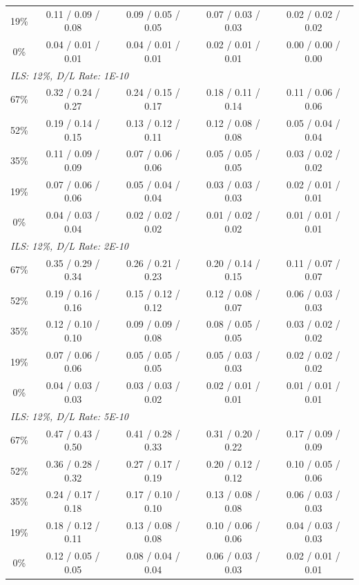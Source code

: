 \begin{table}[!h]
\begin{tabular}{ccccc}
19\% & 0.11 / 0.09 / 0.08 & 0.09 / 0.05 / 0.05 & 0.07 / 0.03 / 0.03 & 0.02 / 0.02 / 0.02\\
0\% & 0.04 / 0.01 / 0.01 & 0.04 / 0.01 / 0.01 & 0.02 / 0.01 / 0.01 & 0.00 / 0.00 / 0.00\\[2ex]
\multicolumn{5}{l}{\em ILS: 12\%, D/L Rate: 1E-10}\\[0.5ex]
67\% & 0.32 / 0.24 / 0.27 & 0.24 / 0.15 / 0.17 & 0.18 / 0.11 / 0.14 & 0.11 / 0.06 / 0.06\\
52\% & 0.19 / 0.14 / 0.15 & 0.13 / 0.12 / 0.11 & 0.12 / 0.08 / 0.08 & 0.05 / 0.04 / 0.04\\
35\% & 0.11 / 0.09 / 0.09 & 0.07 / 0.06 / 0.06 & 0.05 / 0.05 / 0.05 & 0.03 / 0.02 / 0.02\\
19\% & 0.07 / 0.06 / 0.06 & 0.05 / 0.04 / 0.04 & 0.03 / 0.03 / 0.03 & 0.02 / 0.01 / 0.01\\
0\% & 0.04 / 0.03 / 0.04 & 0.02 / 0.02 / 0.02 & 0.01 / 0.02 / 0.02 & 0.01 / 0.01 / 0.01\\[2ex]
\multicolumn{5}{l}{\em ILS: 12\%, D/L Rate: 2E-10}\\[0.5ex]
67\% & 0.35 / 0.29 / 0.34 & 0.26 / 0.21 / 0.23 & 0.20 / 0.14 / 0.15 & 0.11 / 0.07 / 0.07\\
52\% & 0.19 / 0.16 / 0.16 & 0.15 / 0.12 / 0.12 & 0.12 / 0.08 / 0.07 & 0.06 / 0.03 / 0.03\\
35\% & 0.12 / 0.10 / 0.10 & 0.09 / 0.09 / 0.08 & 0.08 / 0.05 / 0.05 & 0.03 / 0.02 / 0.02\\
19\% & 0.07 / 0.06 / 0.06 & 0.05 / 0.05 / 0.05 & 0.05 / 0.03 / 0.03 & 0.02 / 0.02 / 0.02\\
0\% & 0.04 / 0.03 / 0.03 & 0.03 / 0.03 / 0.02 & 0.02 / 0.01 / 0.01 & 0.01 / 0.01 / 0.01\\[2ex]
\multicolumn{5}{l}{\em ILS: 12\%, D/L Rate: 5E-10}\\[0.5ex]
67\% & 0.47 / 0.43 / 0.50 & 0.41 / 0.28 / 0.33 & 0.31 / 0.20 / 0.22 & 0.17 / 0.09 / 0.09\\
52\% & 0.36 / 0.28 / 0.32 & 0.27 / 0.17 / 0.19 & 0.20 / 0.12 / 0.12 & 0.10 / 0.05 / 0.06\\
35\% & 0.24 / 0.17 / 0.18 & 0.17 / 0.10 / 0.10 & 0.13 / 0.08 / 0.08 & 0.06 / 0.03 / 0.03\\
19\% & 0.18 / 0.12 / 0.11 & 0.13 / 0.08 / 0.08 & 0.10 / 0.06 / 0.06 & 0.04 / 0.03 / 0.03\\
0\% & 0.12 / 0.05 / 0.05 & 0.08 / 0.04 / 0.04 & 0.06 / 0.03 / 0.03 & 0.02 / 0.01 / 0.01\\
\bottomrule
\end{tabular}
\end{table}

